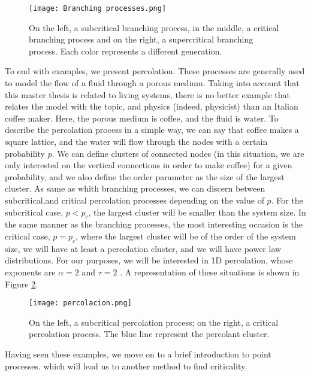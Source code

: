 \begin{figure}[H]
    \centering
    \texttt{[image: Branching processes.png]}
    \caption{On the left, a subcritical branching process, in the middle, a critical branching process and on the right, a supercritical branching process. Each color represents a different
    generation.}
    \label{f:branching_processes}   
\end{figure}

To end with examples, we present percolation. These processes are generally used to model the flow of a fluid through a porous medium. Taking into account that this master 
thesis is related to living systems, there is no better example that relates the model with the topic, and physics (indeed, physicist) than an Italian coffee maker. Here, the porous 
medium is coffee, and the fluid is water. To describe the percolation process in a simple way, we can say that coffee makes a square lattice, and the water will flow through the nodes 
with a certain probability $p$. We can define clusters of connected nodes (in this situation, we are only interested on the vertical connections in order to make coffee)
for a given probability, and we also define the order parameter as the size of the largest cluster. 
As same as whith branching processes, we can discern between subcritical,and critical percolation processes depending on the value of $p$. For the subcritical case, $p<p_c$,
the largest cluster will be smaller than the system size. In the same manner as the branching processes, the most interesting occasion is the critical case, $p=p_c$, 
where the largest cluster will be of the order of the system size, we will have at least a percolation cluster, 
and we will have power law distributions. For our purposes, we will be interested in 1D percolation, whose exponents 
are $\alpha=2$ and $\tau=2$ \cite{stauffer2018introduction}. A representation of these situations is shown in Figure \ref{f:percolation}.

\begin{figure}[H]
    \centering
    \texttt{[image: percolacion.png]}
    \caption{On the left, a subcritical percolation process; on the right, a critical percolation process. The blue line represent the percolant cluster.}
    \label{f:percolation}
\end{figure}

Having seen these examples, we move on to a brief introduction to point processes. which will lead us to another method to find criticality.

